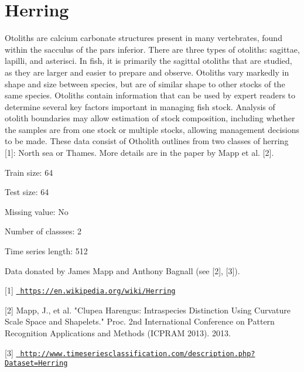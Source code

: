 \chapter{Herring}
\hypertarget{md_external_2data_2UCRArchive__2018_2Herring_2README}{}\label{md_external_2data_2UCRArchive__2018_2Herring_2README}
\label{md_external_2data_2UCRArchive__2018_2Herring_2README_autotoc_md119}%
%
 Otoliths are calcium carbonate structures present in many vertebrates, found within the sacculus of the pars inferior. There are three types of otoliths\+: sagittae, lapilli, and asterisci. In fish, it is primarily the sagittal otoliths that are studied, as they are larger and easier to prepare and observe. Otoliths vary markedly in shape and size between species, but are of similar shape to other stocks of the same species. Otoliths contain information that can be used by expert readers to determine several key factors important in managing fish stock. Analysis of otolith boundaries may allow estimation of stock composition, including whether the samples are from one stock or multiple stocks, allowing management decisions to be made. These data consist of Otholith outlines from two classes of herring \mbox{[}1\mbox{]}\+: North sea or Thames. More details are in the paper by Mapp et al. \mbox{[}2\mbox{]}.

Train size\+: 64

Test size\+: 64

Missing value\+: No

Number of classses\+: 2

Time series length\+: 512

Data donated by James Mapp and Anthony Bagnall (see \mbox{[}2\mbox{]}, \mbox{[}3\mbox{]}).

\mbox{[}1\mbox{]} \href{https://en.wikipedia.org/wiki/Herring}{\texttt{ https\+://en.\+wikipedia.\+org/wiki/\+Herring}}

\mbox{[}2\mbox{]} Mapp, J., et al. "{}\+Clupea Harengus\+: Intraspecies Distinction Using Curvature Scale Space and Shapelets."{} Proc. 2nd International Conference on Pattern Recognition Applications and Methods (ICPRAM 2013). 2013.

\mbox{[}3\mbox{]} \href{http://www.timeseriesclassification.com/description.php?Dataset=Herring}{\texttt{ http\+://www.\+timeseriesclassification.\+com/description.\+php?\+Dataset=\+Herring}} 